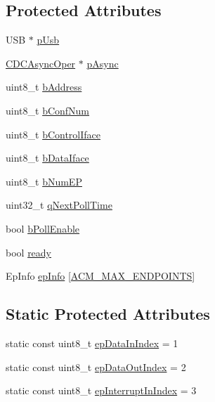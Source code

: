 \subsection*{\-Protected \-Attributes}
\begin{DoxyCompactItemize}
\item 
\-U\-S\-B $\ast$ \hyperlink{class_a_c_m_ae403b0129d7beda921de9d9586b597f7}{p\-Usb}
\item 
\hyperlink{class_c_d_c_async_oper}{\-C\-D\-C\-Async\-Oper} $\ast$ \hyperlink{class_a_c_m_a3f160c6c757994f0c30bd5c5f1fb9d95}{p\-Async}
\item 
uint8\-\_\-t \hyperlink{class_a_c_m_abaa06a619a519f4cb39cc8482af6f111}{b\-Address}
\item 
uint8\-\_\-t \hyperlink{class_a_c_m_af1a17c2d77625599da12b26cb0c90d39}{b\-Conf\-Num}
\item 
uint8\-\_\-t \hyperlink{class_a_c_m_a5512d9e8c8c59371f16018fe8ce46b19}{b\-Control\-Iface}
\item 
uint8\-\_\-t \hyperlink{class_a_c_m_a720b72b524e03da8f17c045e0d689ba1}{b\-Data\-Iface}
\item 
uint8\-\_\-t \hyperlink{class_a_c_m_a058b4d4a088a002fcde4fb2b75e33f93}{b\-Num\-E\-P}
\item 
uint32\-\_\-t \hyperlink{class_a_c_m_a6701d70ae4734e8a81971d9fb8b085f2}{q\-Next\-Poll\-Time}
\item 
bool \hyperlink{class_a_c_m_acd6716c4fc871942fca55e1501dc5b09}{b\-Poll\-Enable}
\item 
bool \hyperlink{class_a_c_m_a8ebf4b872b0ed66e93b4ed39f46290fd}{ready}
\item 
\-Ep\-Info \hyperlink{class_a_c_m_a60fb6a365b78fb80a4a9842e364cf1a3}{ep\-Info} \mbox{[}\hyperlink{cdcacm_8h_aa11e629b02a0cd7d768f796732cb2694}{\-A\-C\-M\-\_\-\-M\-A\-X\-\_\-\-E\-N\-D\-P\-O\-I\-N\-T\-S}\mbox{]}
\end{DoxyCompactItemize}
\subsection*{\-Static \-Protected \-Attributes}
\begin{DoxyCompactItemize}
\item 
static const uint8\-\_\-t \hyperlink{class_a_c_m_a5917b5098e529fafe67a53e03f1e7011}{ep\-Data\-In\-Index} = 1
\item 
static const uint8\-\_\-t \hyperlink{class_a_c_m_a0dc940bc4f1bed7525bb768e37e6cb61}{ep\-Data\-Out\-Index} = 2
\item 
static const uint8\-\_\-t \hyperlink{class_a_c_m_a9b32207fdf256e5f8553ba4048b64307}{ep\-Interrupt\-In\-Index} = 3
\end{DoxyCompactItemize}


